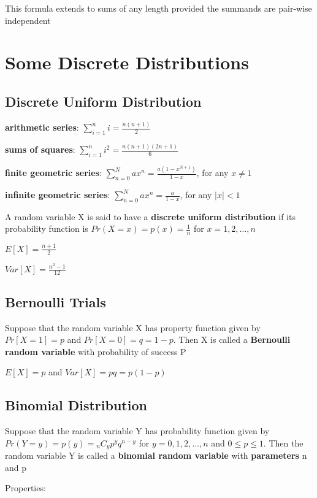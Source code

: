\documentclass[12pt]{article}
\begin{document}
\begin{spacing}{2.0}
This formula extends to sums of any length provided the summands are pair-wise independent

\section{Some Discrete Distributions}

\subsection{Discrete Uniform Distribution}

\textbf{arithmetic series}: $\sum\limits_{i=1}^{n} i = \frac{n(n+1)}{2}$

\textbf{sums of squares}: $\sum\limits_{i=1}^{n} i^2 = \frac{n(n+1)(2n+1)}{6}$

\textbf{finite geometric series}: $\sum\limits_{n=0}^{N} ax^n = \frac{a(1-x^{N+1})}{1-x}$, for any $x\ne 1$

\textbf{infinite geometric series}: $\sum\limits_{n=0}^{N} ax^n = \frac{a}{1-x}$, for any $|x| < 1$


A random variable X is said to have a \textbf{discrete uniform distribution} if its probability function is $Pr(X=x)= p(x) = \frac{1}{n}$ for $x=1,2,\ldots,n$

$E[X]=\frac{n+1}{2}$

$Var[X]=\frac{n^2-1}{12}$

\subsection{Bernoulli Trials}

Suppose that the random variable X has property function given by $Pr[X=1]=p$ and $Pr[X=0]=q=1-p$. Then X is called a \textbf{Bernoulli random variable} with probability of success P

$E[X]=p$ and $Var[X]=pq=p(1-p)$

\subsection{Binomial Distribution}

Suppose that the random variable Y has probability function given by $Pr(Y=y)= p(y)= {}_{n}C_{y}p^y q^{n-y}$ for $y=0,1,2,\ldots,n$ and $0 \le p \le 1$. Then the random variable Y is called a \textbf{binomial random variable} with \textbf{parameters} n and p

Properties:


\end{spacing}
\end{document}
